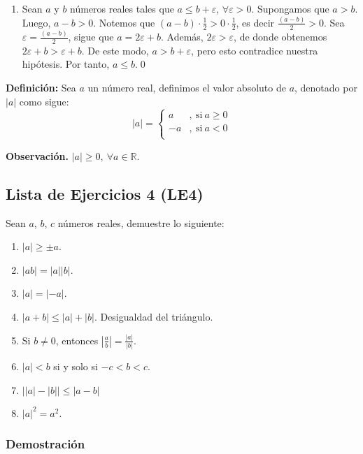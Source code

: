 \documentclass[11pt]{article}
\newcommand{\R}{\mathbb{R}}
\begin{document}
\begin{enumerate}[label=\alph*),font=\bfseries]
    \item Sean $a$ y $b$ números reales tales que $a \leq b + \varepsilon$, $\forall \varepsilon > 0$. Supongamos que $a > b$. Luego, $a-b>0$. Notemos que $(a-b) \cdot \frac{1}{2} > 0 \cdot \frac{1}{2}$, es decir $\frac{(a-b)}{2} > 0$. Sea $\varepsilon = \frac{(a-b)}{2}$, sigue que $a=2\varepsilon+b$. Además, $2\varepsilon > \varepsilon$, de donde obtenemos $2 \varepsilon + b > \varepsilon + b$. De este modo, $a > b+\varepsilon$, pero esto contradice nuestra hipótesis. Por tanto, $a \leq b$.\qed

\end{enumerate}

\textbf{Definición:} Sea $a$ un número real, definimos el valor absoluto de $a$, denotado por $|a|$ como sigue: 
    \[
    |a| = 
    \left \{
        \begin{aligned}
        a &,\ \text{si} \ a \geq 0\\
        -a &,\ \text{si} \ a < 0 \\
        \end{aligned}
    \right .
    \]

\textbf{Observación.} $|a|\geq 0, \ \forall a\in \R$.

\subsection*{Lista de Ejercicios 4 (LE4)}

Sean $a$, $b$, $c$ números reales, demuestre lo siguiente:

\begin{enumerate}[label=\alph*),font=\bfseries]
    \item $|a| \geq \pm a$. %
    \item $|ab|=|a||b|$. %
    \item $|a|=|-a|$. %
    \item $|a+b|\leq |a|+|b|$. Desigualdad del triángulo. %
    \item Si $b\neq 0$, entonces $\left| \frac{a}{b} \right| = \frac{|a|}{|b|}$. %
    \item $|a|<b$ si y solo si $-c<b<c$. %
    \item $ \big| |a|-|b| \big| \leq |a-b|$ %
    \item $|a|^2=a^2$.
\end{enumerate}

\subsubsection*{Demostración}
\end{document}
